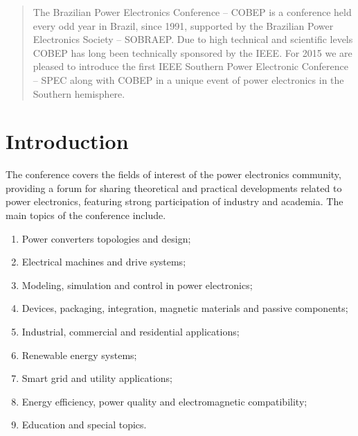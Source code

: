 \documentclass[a4paper,oneside,onecolumn,draftcls,12pt,conference]{IEEEtran}
\begin{document}
\maketitle

\begin{abstract}
The Brazilian Power Electronics Conference -- COBEP is a conference held every odd year in Brazil, since 1991, supported by the Brazilian Power Electronics Society -- SOBRAEP. Due to high technical and scientific levels COBEP has long been technically sponsored by the IEEE. For 2015 we are pleased to introduce the first IEEE Southern Power Electronic Conference -- SPEC along with COBEP in a unique event of power electronics in the Southern hemisphere.
\end{abstract}





%
\IEEEpeerreviewmaketitle



\section{Introduction}

The conference covers the fields of interest of the power electronics community, providing a forum for sharing theoretical and practical developments related to power electronics, featuring strong participation of industry and academia.
The main topics of the conference include.


\begin{enumerate}
\item	Power converters topologies and design;
\item	Electrical machines and drive systems;
\item	Modeling, simulation and control in power electronics;
\item	Devices,   packaging,   integration,   magnetic   materials   and passive components;
\item	Industrial, commercial and residential applications;
\item	Renewable energy systems;
\item	Smart grid and utility applications;
\item	Energy  efficiency,   power   quality   and   electromagnetic compatibility;
\item	Education and special topics.	
\end{enumerate}
\end{document}
